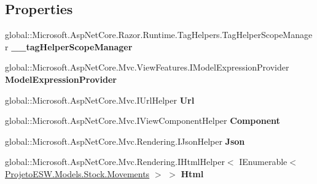 \subsection*{Properties}
\begin{DoxyCompactItemize}
\item 
\mbox{\label{class_asp_net_core_1_1_views___movements___index_aa845b21c9eda9501e6462cf4285ee382}} 
global\+::\+Microsoft.\+Asp\+Net\+Core.\+Razor.\+Runtime.\+Tag\+Helpers.\+Tag\+Helper\+Scope\+Manager {\bfseries \+\_\+\+\_\+tag\+Helper\+Scope\+Manager}
\item 
\mbox{\label{class_asp_net_core_1_1_views___movements___index_ad9e2afcac91e2567effa564341428da0}} 
global\+::\+Microsoft.\+Asp\+Net\+Core.\+Mvc.\+View\+Features.\+I\+Model\+Expression\+Provider {\bfseries Model\+Expression\+Provider}
\item 
\mbox{\label{class_asp_net_core_1_1_views___movements___index_abd1f6b74e438b8f507e482c6d8503c10}} 
global\+::\+Microsoft.\+Asp\+Net\+Core.\+Mvc.\+I\+Url\+Helper {\bfseries Url}
\item 
\mbox{\label{class_asp_net_core_1_1_views___movements___index_abef727166aedd8d5e782db1b3da19fe1}} 
global\+::\+Microsoft.\+Asp\+Net\+Core.\+Mvc.\+I\+View\+Component\+Helper {\bfseries Component}
\item 
\mbox{\label{class_asp_net_core_1_1_views___movements___index_a753a742042507d0cd8e71c2367c09ac0}} 
global\+::\+Microsoft.\+Asp\+Net\+Core.\+Mvc.\+Rendering.\+I\+Json\+Helper {\bfseries Json}
\item 
\mbox{\label{class_asp_net_core_1_1_views___movements___index_a8db9b2b02410720dc5217d1ffdd397c1}} 
global\+::\+Microsoft.\+Asp\+Net\+Core.\+Mvc.\+Rendering.\+I\+Html\+Helper$<$ I\+Enumerable$<$ \mbox{\hyperlink{class_projeto_e_s_w_1_1_models_1_1_stock_1_1_movements}{Projeto\+E\+S\+W.\+Models.\+Stock.\+Movements}} $>$ $>$ {\bfseries Html}
\end{DoxyCompactItemize}
